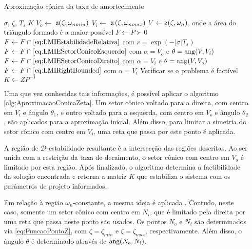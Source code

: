 \begin{algorithm}[ht!]
  \caption{Aproximação cônica da taxa de amortecimento}\label{alg:AproximacaoConicaZeta}
  \begin{algorithmic}[1]
    \Require $\sigma$, $\zeta$, $T_s$
    \Ensure $K$
    \State $V_o \gets $ $\operatorname{\mathrm{z}}(\zeta,\omega_{nmin})$
    \State $V_i \gets $ $\operatorname{\mathrm{z}}\left(\zeta,\omega_{nmax}\right)$
    \State $V \gets \operatorname{\mathrm{z}}(\zeta,\omega_n)$, onde a área do triângulo formado é a maior possível
    \State $F \gets P \succ 0$
    \State $F \gets F \cap \eqref{eq:LMIEstabilidadeRelativa}$ com $r = \exp{\left(-|\sigma|T_s\right)}$ 
    \State $F \gets F \cap \eqref{eq:LMIESetorConicoEsquerdo}$ com $\alpha = V_o$ e $\theta = \operatorname{ang}(V,V_i)$ 
    \State $F \gets F \cap \eqref{eq:LMIESetorConicoDireito}$ com $\alpha = V_i$ e $\theta = \operatorname{ang}(V,V_o)$ 
    \State $F \gets F \cap \eqref{eq:LMIRightBounded}$ com $\alpha = V_i$  
    \State Verificar se o problema é factível
    \State $K \gets ZP^{-1}$
  \end{algorithmic}
\end{algorithm}

Uma que vez conhecidas tais informações, é possível aplicar o algoritmo \ref{alg:AproximacaoConicaZeta}. Um setor cônico voltado para a direita, com centro em $V_i$ e ângulo $\theta_1$, e outro voltado para a esquerda, com centro em $V_o$ e ângulo $\theta_2$, são aplicados para a aproximação inicial. Além disso, para limitar a simetria do setor cônico com centro em $V_i$, uma reta que passa por este ponto é aplicada.

A região de $\mathscr{D}$-estabilidade resultante é a intersecção das regiões descritas. Ao ser unida com a restrição da taxa de decaimento, o setor cônico com centro em $V_o$ é limitado por esta região. Após finalizado, o algoritmo determina a factibilidade da solução encontrada e retorna a matriz $K$ que estabiliza o sistema com os parâmetros de projeto informados.

Em relação à região $\omega_n$-constante, a mesma ideia é aplicada \cite{CHIQUETO2021}. Contudo, neste caso, somente um setor cônico com centro em $N_i$, que é limitado pela direita por uma reta que passa neste ponto são usados. Os pontos $N_o$ e $N_i$ são determinados via \eqref{eq:FuncaoPontoZ}, com $\zeta = \zeta_{min}$ e $\zeta = \zeta_{max}$, respectivamente. Além disso, o ângulo $\theta$ é determinado através de $\operatorname{ang}(N_o,N_i)$.  

